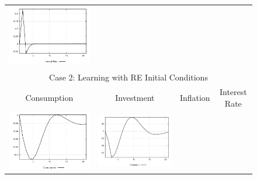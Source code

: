 \begin{figure}
\begin{tabular}{cccc}
\includegraphics[scale=0.22]{results_re/Interest_Rate_mpshock_irf.png} \\ \\ 
\multicolumn{4}{c}{Case 2: Learning with RE Initial Conditions}\\
Consumption & Investment & Inflation & Interest Rate \\ 
\includegraphics[scale=0.22]{results_reallinit/Consumption_mpshock_irf.png} & 
\includegraphics[scale=0.22]{results_reallinit/Investment_mpshock_irf.png} & 

\end{tabular}
\end{figure}
